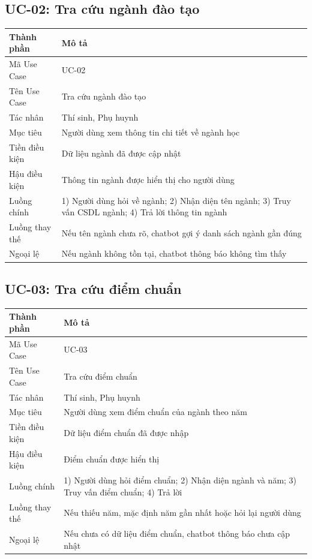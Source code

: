 \subsection{UC-02: Tra cứu ngành đào tạo}
\begin{table}[H]
\centering
\begin{tabular}{|p{3.5cm}|p{8.5cm}|}
\hline
\textbf{Thành phần} & \textbf{Mô tả} \\ \hline
Mã Use Case & UC-02 \\ \hline
Tên Use Case & Tra cứu ngành đào tạo \\ \hline
Tác nhân & Thí sinh, Phụ huynh \\ \hline
Mục tiêu & Người dùng xem thông tin chi tiết về ngành học \\ \hline
Tiền điều kiện & Dữ liệu ngành đã được cập nhật \\ \hline
Hậu điều kiện & Thông tin ngành được hiển thị cho người dùng \\ \hline
Luồng chính & 1) Người dùng hỏi về ngành; 2) Nhận diện tên ngành; 3) Truy vấn CSDL ngành; 4) Trả lời thông tin ngành \\ \hline
Luồng thay thế & Nếu tên ngành chưa rõ, chatbot gợi ý danh sách ngành gần đúng \\ \hline
Ngoại lệ & Nếu ngành không tồn tại, chatbot thông báo không tìm thấy \\ \hline
\end{tabular}
\end{table}

\subsection{UC-03: Tra cứu điểm chuẩn}
\begin{table}[H]
\centering
\begin{tabular}{|p{3.5cm}|p{8.5cm}|}
\hline
\textbf{Thành phần} & \textbf{Mô tả} \\ \hline
Mã Use Case & UC-03 \\ \hline
Tên Use Case & Tra cứu điểm chuẩn \\ \hline
Tác nhân & Thí sinh, Phụ huynh \\ \hline
Mục tiêu & Người dùng xem điểm chuẩn của ngành theo năm \\ \hline
Tiền điều kiện & Dữ liệu điểm chuẩn đã được nhập \\ \hline
Hậu điều kiện & Điểm chuẩn được hiển thị \\ \hline
Luồng chính & 1) Người dùng hỏi điểm chuẩn; 2) Nhận diện ngành và năm; 3) Truy vấn điểm chuẩn; 4) Trả lời \\ \hline
Luồng thay thế & Nếu thiếu năm, mặc định năm gần nhất hoặc hỏi lại người dùng \\ \hline
Ngoại lệ & Nếu chưa có dữ liệu điểm chuẩn, chatbot thông báo chưa cập nhật \\ \hline
\end{tabular}
\end{table}

